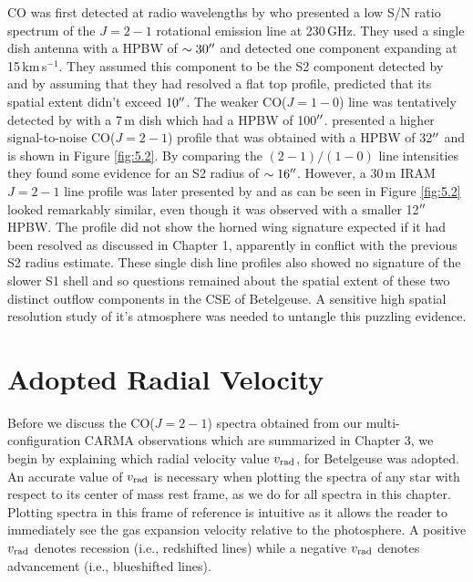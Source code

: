 CO was first detected at radio wavelengths by \cite{knapp_1980} who presented a low S/N ratio spectrum of the $J= 2-1$ rotational emission line at 230\,GHz. They used a single dish antenna with a HPBW of $\sim 30^{\prime\prime}$ and detected one component expanding at 15\,km\,s$^{-1}$. They assumed this component to be the S2 component detected by  \cite{bernat_1979} and by assuming that they had resolved a flat top profile, predicted that its spatial extent didn't exceed $10^{\prime\prime}$. The weaker CO($J=1-0$) line was tentatively detected by \cite{knapp_1985} with a 7\,m dish which had a HPBW of 100$^{\prime\prime}$. \cite{huggins_1987} presented a higher signal-to-noise CO($J=2-1$) profile that was obtained with a HPBW of 32$^{\prime\prime}$ and is shown in Figure \ref{fig:5.2}. By comparing the  $(2-1)/(1-0)$ line intensities they found some evidence for an S2 radius of $\sim 16^{\prime\prime}$. However,  a 30\,m IRAM $J= 2-1$ line profile was later presented by \cite{huggins_1994} and as can be seen in Figure \ref{fig:5.2} looked remarkably similar, even though it was observed with a smaller 12$^{\prime\prime}$ HPBW. The profile did not show the horned wing signature expected if it had been resolved as discussed in Chapter 1, apparently in conflict with the previous S2 radius estimate. These single dish line profiles also showed no signature of the slower S1 shell and so questions remained about the spatial extent of these two distinct outflow components in the CSE of Betelgeuse. A sensitive high spatial resolution study of it's atmosphere was needed to untangle this puzzling evidence.

\section{Adopted Radial Velocity}\label{sec:5.2}

Before we discuss the CO($J=2-1$) spectra obtained from our multi-configuration CARMA observations which are summarized in Chapter 3, we begin by explaining which radial velocity value $v_{\rm{rad}}$, for Betelgeuse was adopted. An accurate value of $v_{\rm{rad}}$ is necessary when plotting the spectra of any star with respect to its center of mass rest frame, as we do for all spectra in this chapter. Plotting spectra in this frame of reference is intuitive as it allows the reader to immediately see the gas expansion velocity relative to the photosphere. A positive $v_{\rm{rad}}$ denotes recession (i.e., redshifted lines) while a negative $v_{\rm{rad}}$ denotes advancement (i.e., blueshifted lines).

